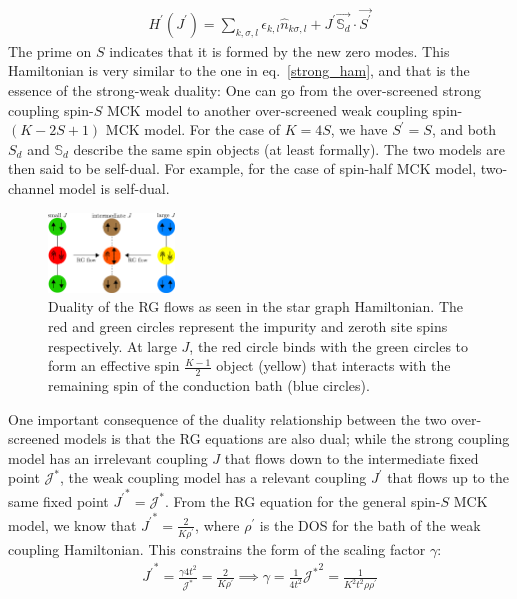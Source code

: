 \documentclass[reprint,prb,superscriptaddress]{revtex4-2}
\begin{document}
\begin{equation}\begin{aligned}
	H^\prime(J^\prime) = \sum_{k,\sigma,l}\epsilon_{k,l} \hat n_{k\sigma,l} + J^\prime \vec{\mathbb{S}_d}\cdot\vec{S^\prime}
\end{aligned}\end{equation}
The prime on \(S\) indicates that it is formed by the new zero modes. This Hamiltonian is very similar to the one in eq.~\ref{strong_ham}, and that is the essence of the strong-weak duality: One can go from the over-screened strong coupling spin-\(S\) MCK model to another over-screened weak coupling spin-\((K-2S+1)\) MCK model. For the case of \(K=4S\), we have \(S^\prime = S\), and both \(S_d\) and \(\mathbb{S}_d\) describe the same spin objects (at least formally). The two models are then said to be self-dual. For example, for the case of spin-half MCK model, two-channel model is self-dual.
\begin{figure}[!htpb]
	\centering
	\includegraphics[width=0.3\textwidth]{plt/duality.pdf}
	\caption{Duality of the RG flows as seen in the star graph Hamiltonian. The red and green circles represent the impurity and zeroth site spins respectively. At large \(J\), the red circle binds with the green circles to form an effective spin \(\frac{K-1}{2}\) object (yellow) that interacts with the remaining spin of the conduction bath (blue circles).}
	\label{duality_fig}
\end{figure}

One important consequence of the duality relationship between the two over-screened models is that the RG equations are also dual; while the strong coupling model has an irrelevant coupling \(J\) that flows down to the intermediate fixed point \({\mathcal{J}^*}\), the weak coupling model has a relevant coupling \(J^\prime\) that flows up to the same fixed point \({J^\prime}^* = {\mathcal{J}^*}\). From the RG equation for the general spin-\(S\) MCK model, we know that \({J^\prime}^* = \frac{2}{K \rho^\prime}\), where \(\rho^\prime\) is the DOS for the bath of the weak coupling Hamiltonian. This constrains the form of the scaling factor \(\gamma\):
\begin{equation}\begin{aligned}
	{J^\prime}^* = \frac{\gamma 4t^2}{{\mathcal{J}^*}} = \frac{2}{K \rho^\prime} \implies \gamma = \frac{1}{4t^2} {{\mathcal{J}^*}}^2 = \frac{1}{K^2 t^2 \rho \rho^\prime}
\end{aligned}\end{equation}
\end{document}
